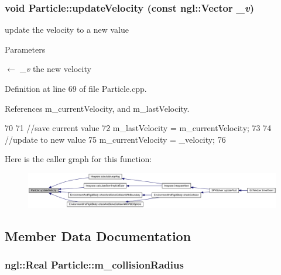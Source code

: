 \hypertarget{class_particle_adacb41b0128b528cb8313337fa224672}{
\subsubsection[{updateVelocity}]{\setlength{\rightskip}{0pt plus 5cm}void Particle::updateVelocity (const ngl::Vector {\em \_\-v})}}
\label{class_particle_adacb41b0128b528cb8313337fa224672}


update the velocity to a new value 


\begin{DoxyParams}{Parameters}
\item[\mbox{$\leftarrow$} {\em \_\-v}]the new velocity \end{DoxyParams}


Definition at line 69 of file Particle.cpp.



References m\_\-currentVelocity, and m\_\-lastVelocity.




\begin{DoxyCode}
70 {
71     //save current value
72     m_lastVelocity = m_currentVelocity;
73 
74     //update to new value
75     m_currentVelocity = _velocity;
76 }
\end{DoxyCode}




Here is the caller graph for this function:\nopagebreak
\begin{figure}[H]
\begin{center}
\leavevmode
\includegraphics[width=420pt]{class_particle_adacb41b0128b528cb8313337fa224672_icgraph}
\end{center}
\end{figure}




\subsection{Member Data Documentation}
\hypertarget{class_particle_a8bbc5654eda48d6b06c8d768d52cd74b}{
\subsubsection[{m\_\-collisionRadius}]{\setlength{\rightskip}{0pt plus 5cm}ngl::Real {\bf Particle::m\_\-collisionRadius}}}
\label{class_particle_a8bbc5654eda48d6b06c8d768d52cd74b}


